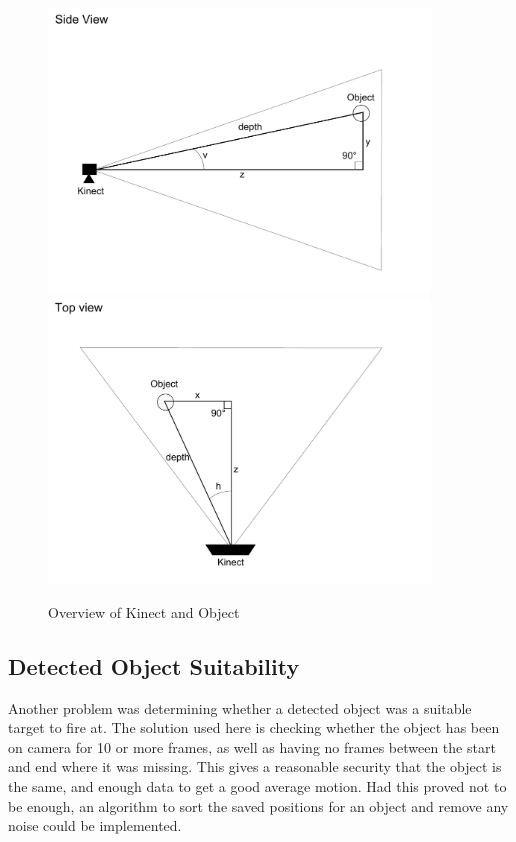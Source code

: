 \begin{figure}[hbtp]
\includegraphics[width=0.90\textwidth]{img/kinectfigside.pdf}
\includegraphics[width=0.90\textwidth]{img/kinectfigtop.pdf}
\caption{Overview of Kinect and Object} 
\label{fig:kinectfig} 
\end{figure}

\subsection{Detected Object Suitability}

Another problem was determining whether a detected object was a suitable target to fire at. The solution used here is
checking whether the object has been on camera for 10 or more frames, as well as having no frames between the start and
end where it was missing. This gives a reasonable security that the object is the same, and enough data
to get a good average motion. Had this proved not to be enough, an algorithm to sort the saved positions for an object
and remove any noise could be implemented.

